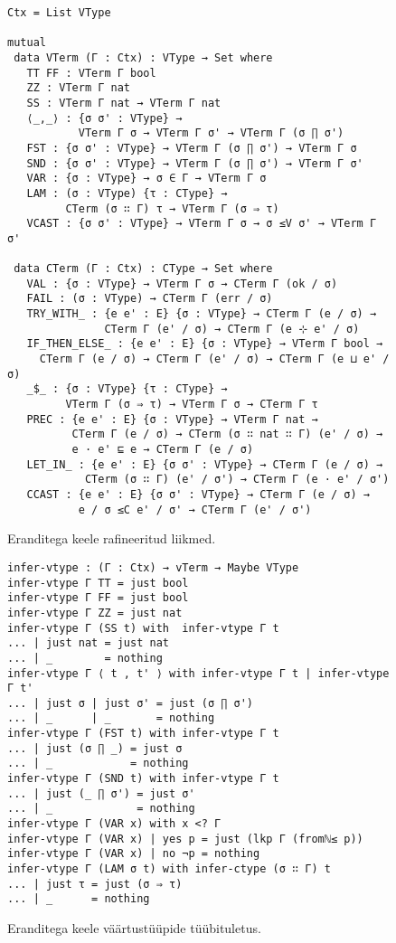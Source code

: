 \documentclass[a4paper,12pt]{article}
\begin{document}
\begin{figure}
  \begin{verbatim}
Ctx = List VType

mutual
 data VTerm (Γ : Ctx) : VType → Set where
   TT FF : VTerm Γ bool
   ZZ : VTerm Γ nat
   SS : VTerm Γ nat → VTerm Γ nat
   ⟨_,_⟩ : {σ σ' : VType} →
           VTerm Γ σ → VTerm Γ σ' → VTerm Γ (σ ∏ σ')
   FST : {σ σ' : VType} → VTerm Γ (σ ∏ σ') → VTerm Γ σ
   SND : {σ σ' : VType} → VTerm Γ (σ ∏ σ') → VTerm Γ σ'
   VAR : {σ : VType} → σ ∈ Γ → VTerm Γ σ
   LAM : (σ : VType) {τ : CType} →
         CTerm (σ ∷ Γ) τ → VTerm Γ (σ ⇒ τ)
   VCAST : {σ σ' : VType} → VTerm Γ σ → σ ≤V σ' → VTerm Γ σ'

 data CTerm (Γ : Ctx) : CType → Set where
   VAL : {σ : VType} → VTerm Γ σ → CTerm Γ (ok / σ)
   FAIL : (σ : VType) → CTerm Γ (err / σ)
   TRY_WITH_ : {e e' : E} {σ : VType} → CTerm Γ (e / σ) →
               CTerm Γ (e' / σ) → CTerm Γ (e ⊹ e' / σ)
   IF_THEN_ELSE_ : {e e' : E} {σ : VType} → VTerm Γ bool →
     CTerm Γ (e / σ) → CTerm Γ (e' / σ) → CTerm Γ (e ⊔ e' / σ)
   _$_ : {σ : VType} {τ : CType} →
         VTerm Γ (σ ⇒ τ) → VTerm Γ σ → CTerm Γ τ
   PREC : {e e' : E} {σ : VType} → VTerm Γ nat →
          CTerm Γ (e / σ) → CTerm (σ ∷ nat ∷ Γ) (e' / σ) →
          e · e' ⊑ e → CTerm Γ (e / σ)
   LET_IN_ : {e e' : E} {σ σ' : VType} → CTerm Γ (e / σ) →
            CTerm (σ ∷ Γ) (e' / σ') → CTerm Γ (e · e' / σ')
   CCAST : {e e' : E} {σ σ' : VType} → CTerm Γ (e / σ) →
           e / σ ≤C e' / σ' → CTerm Γ (e' / σ')
  \end{verbatim}
  \caption{Eranditega keele rafineeritud liikmed.}
  \label{fig:exc.refined}
\end{figure}




\begin{figure}
  \begin{verbatim}
infer-vtype : (Γ : Ctx) → vTerm → Maybe VType
infer-vtype Γ TT = just bool
infer-vtype Γ FF = just bool
infer-vtype Γ ZZ = just nat
infer-vtype Γ (SS t) with  infer-vtype Γ t
... | just nat = just nat
... | _        = nothing
infer-vtype Γ ⟨ t , t' ⟩ with infer-vtype Γ t | infer-vtype Γ t'
... | just σ | just σ' = just (σ ∏ σ')
... | _      | _       = nothing
infer-vtype Γ (FST t) with infer-vtype Γ t
... | just (σ ∏ _) = just σ
... | _            = nothing
infer-vtype Γ (SND t) with infer-vtype Γ t
... | just (_ ∏ σ') = just σ'
... | _             = nothing
infer-vtype Γ (VAR x) with x <? Γ
infer-vtype Γ (VAR x) | yes p = just (lkp Γ (fromℕ≤ p))
infer-vtype Γ (VAR x) | no ¬p = nothing
infer-vtype Γ (LAM σ t) with infer-ctype (σ ∷ Γ) t
... | just τ = just (σ ⇒ τ)
... | _      = nothing\end{verbatim}
  \caption{Eranditega keele väärtustüüpide tüübituletus.}
  \label{fig:exc.infer-vtype}
\end{figure}
\end{document}
